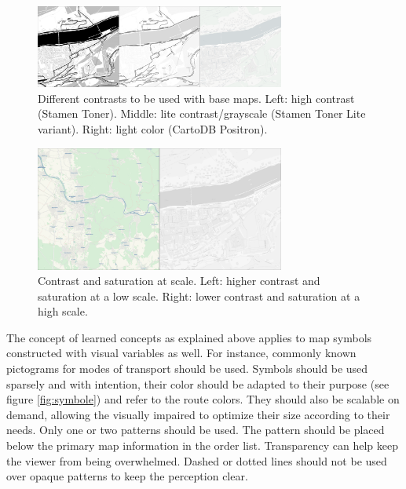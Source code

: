 \documentclass[agile, final]{copernicus-agile}
\begin{document}
\begin{figure}[ht]
  \includegraphics[width=8.2cm]{figures/basemap_basic.png}
\caption{Different contrasts to be used with base maps. Left: high contrast (Stamen Toner\footnotemark). Middle: lite contrast/grayscale (Stamen Toner Lite variant\footnotemark). Right: light color (CartoDB Positron\footnotemark).}
\label{fig:basemap_basic}
\end{figure}


\begin{figure}[ht]
  \includegraphics[width=8.2cm]{figures/basemap_scale_contrast.png}
\caption{Contrast and saturation at scale. Left: higher contrast and saturation at a low scale. Right: lower contrast and saturation at a high scale.}
\label{fig:basemap_scale_contrast}
\end{figure}

The concept of learned concepts as explained above applies to map symbols constructed with visual variables as well. For instance, commonly known pictograms for modes of transport should be used. Symbols should be used sparsely and with intention, their color should be adapted to their purpose (see figure \ref{fig:symbole}) and refer to the route colors. They should also be scalable on demand, allowing the visually impaired to optimize their size according to their needs. Only one or two patterns should be used. The pattern should be placed below the primary map information in the order list. Transparency can help keep the viewer from being overwhelmed. Dashed or dotted lines should not be used over opaque patterns to keep the perception clear.
\end{document}
